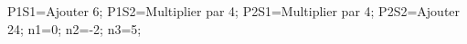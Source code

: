 \documentclass[exercice]{thedocument}%
\begin{document}
%
    \>P1S1=Ajouter 6;%
    \>P1S2=Multiplier par 4;%
    \>P2S1=Multiplier par 4;%
    \>P2S2=Ajouter 24;%
    \>n1=0;%
    \>n2=-2;%
    \>n3=5;%
\end{document}
